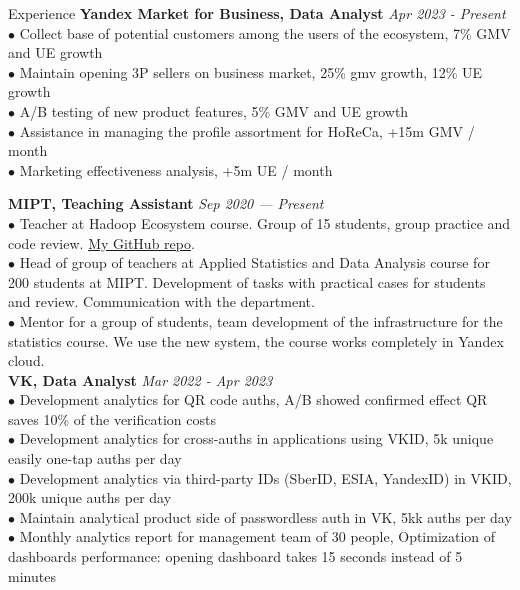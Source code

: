 \documentclass{resume} %
\begin{document}
\begin{rSection}{ Experience }
    { \bf Yandex Market for Business, Data Analyst} \hfill {\em Apr 2023 - Present}\\
    { $\bullet$ Collect base of potential customers among the users of the ecosystem, 7\% GMV and UE growth } \\
    { $\bullet$ Maintain opening 3P sellers on business market, 25\% gmv growth, 12\% UE growth} \\
    { $\bullet$ A/B testing of new product features, 5\% GMV and UE growth} \\ 
    { $\bullet$ Assistance in managing the profile assortment for HoReCa, +15m GMV / month} \\
    { $\bullet$ Marketing effectiveness analysis, +5m UE / month}

    { \bf MIPT, Teaching Assistant} \hfill {\em Sep 2020 — Present}\\
    { $\bullet$ Teacher at Hadoop Ecosystem course. Group of 15 students, group practice and code review. \href{https://github.com/YHx07/pd-seminars}{My GitHub repo}.}\\
    { $\bullet$ Head of group of teachers at Applied Statistics and Data Analysis course for 200 students at MIPT. Development of tasks with practical cases for students and review. Communication with the department. }\\
    { $\bullet$ Mentor for a group of students, team development of the infrastructure for the statistics course. We use the new system, the course works completely in Yandex cloud.}\\

    { \bf VK, Data Analyst} \hfill {\em Mar 2022 - Apr 2023}\\
    { $\bullet$ Development analytics for QR code auths, A/B showed confirmed effect QR saves 10\% of the verification costs} \\
    { $\bullet$ Development analytics for cross-auths in applications using VKID, 5k unique easily one-tap auths per day}\\
    { $\bullet$ Development analytics via third-party IDs (SberID, ESIA, YandexID) in VKID, 200k unique auths per day}\\
    { $\bullet$ Maintain analytical product side of passwordless auth in VK, 5kk auths per day }\\
    {$\bullet$ Monthly analytics report for management team of 30 people, Optimization of dashboards performance: opening dashboard takes 15 seconds instead of 5 minutes}


\end{rSection}
\end{document}
